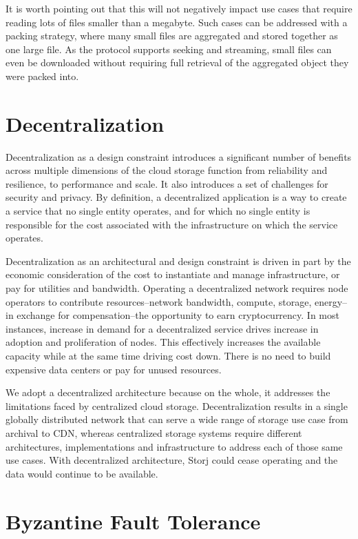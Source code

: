 \documentclass[11pt,fleqn,openany]{book}
\begin{document}
It is worth pointing out that this will not negatively impact use cases that
require reading lots of files smaller than a megabyte. Such cases can be
addressed with a packing strategy, where many small files are aggregated and
stored together as one large file.
As the protocol supports seeking and streaming, small files can even be
downloaded without requiring full retrieval of the aggregated object they were
packed into.

\section{Decentralization}

Decentralization as a design constraint introduces a significant number of
benefits across multiple dimensions of the cloud storage function from
reliability and resilience, to performance and scale.
It also introduces a set of challenges for security and privacy.
By definition, a decentralized application is a way to create a service that
no single entity operates, and for which no single entity is responsible for
the cost associated with the infrastructure on which the service operates.

Decentralization as an architectural and design constraint is driven in part
by the economic consideration of the cost to instantiate and manage
infrastructure, or pay for utilities and bandwidth.
Operating a decentralized network requires node operators to contribute
resources--network bandwidth, compute, storage, energy--in exchange for
compensation--the opportunity to earn cryptocurrency.
In most instances, increase in demand for a decentralized service drives
increase in adoption and proliferation of nodes.
This effectively increases the available capacity while at the same time
driving cost down.
There is no need to build expensive data centers or pay for unused resources.

We adopt a decentralized architecture because on the whole, it addresses the
limitations faced by centralized cloud storage.
Decentralization results in a single globally distributed network that can
serve a wide range of storage use case from archival to CDN, whereas
centralized storage systems require different architectures, implementations
and infrastructure to address each of those same use cases.
With decentralized architecture, Storj could cease operating and the data
would continue to be available.

\section{Byzantine Fault Tolerance}
\end{document}

